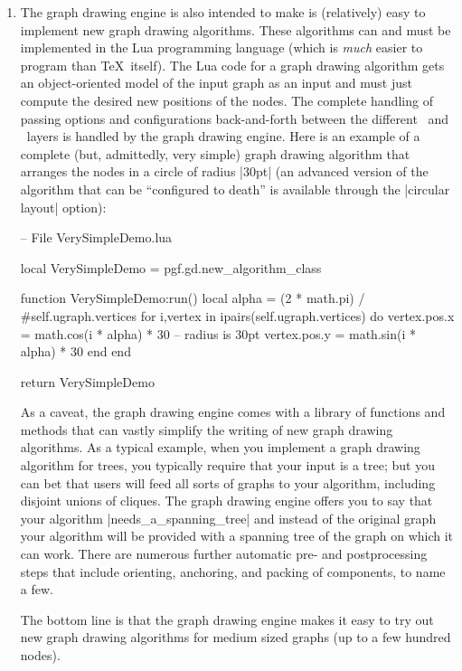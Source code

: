 \begin{enumerate}
\begin{codeexample}[]
{  \draw (node 1) edge (node 2)
        (node 2) edge (node 3)
                 edge (node 4)
        (node 3) edge (node 4)
                 edge (node 5)
                 edge (node 6);
}
\end{codeexample}
  In all of the example, the positions of the nodes have only been
  computed \emph{after} all nodes have been created and the edges have
  been specified. For instance, in the last example, without the
  option |spring electrical layout|, all of the nodes would have been
  placed on top of each other.
\item The graph drawing engine is also intended to make is
  (relatively) easy to implement new graph drawing algorithms. These
  algorithms can and must be implemented in the Lua programming
  language (which is \emph{much} easier to program than \TeX\
  itself). The Lua code for a graph drawing algorithm gets an
  object-oriented model of the input graph as an input and must just
  compute the desired new positions of the nodes. The complete
  handling of passing options and configurations back-and-forth
  between the different \tikzname\ and \pgfname\ layers is handled by
  the graph drawing engine. Here is an example of a complete (but,
  admittedly, very simple) graph drawing algorithm that arranges the
  nodes in a circle of radius |30pt| (an advanced version of the
  algorithm that can be ``configured to death'' is available through
  the |circular layout| option): 
\begin{codeexample}
-- File VerySimpleDemo.lua

local VerySimpleDemo = pgf.gd.new_algorithm_class {}

function VerySimpleDemo:run()
  local alpha = (2 * math.pi) / #self.ugraph.vertices
  for i,vertex in ipairs(self.ugraph.vertices) do
    vertex.pos.x = math.cos(i * alpha) * 30  -- radius is 30pt
    vertex.pos.y = math.sin(i * alpha) * 30
  end
end

return VerySimpleDemo      
\end{codeexample}

  As a caveat, the graph drawing engine comes with a library of
  functions and methods that can vastly simplify the writing of new
  graph drawing algorithms. As a typical example, when you implement a 
  graph drawing algorithm for trees, you typically require that your
  input is a tree; but you can bet that users will feed all sorts of
  graphs to your algorithm, including disjoint unions of cliques. The
  graph drawing engine offers you to say that your algorithm
  |needs_a_spanning_tree| and instead of the original graph your
  algorithm will be provided with a spanning tree of the graph on
  which it can work. There are numerous further automatic pre- and
  postprocessing steps that include orienting, anchoring, and packing
  of components, to name a few.
  
  The bottom line is that the graph drawing engine makes it easy
  to try out new graph drawing algorithms for medium sized graphs (up
  to a few hundred nodes).
\end{enumerate}

